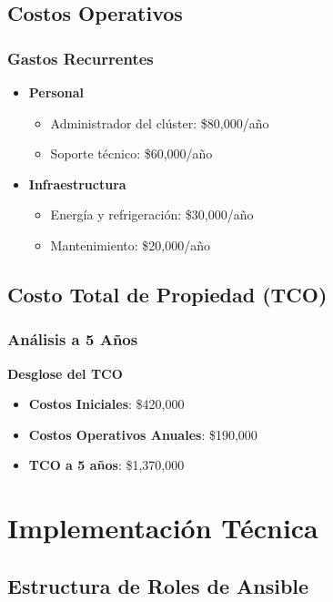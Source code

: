 \section{Costos Operativos}
\subsection{Gastos Recurrentes}
\begin{itemize}
    \item \textbf{Personal}
    \begin{itemize}
        \item Administrador del clúster: \$80,000/año
        \item Soporte técnico: \$60,000/año
    \end{itemize}
    \item \textbf{Infraestructura}
    \begin{itemize}
        \item Energía y refrigeración: \$30,000/año
        \item Mantenimiento: \$20,000/año
    \end{itemize}
\end{itemize}

\section{Costo Total de Propiedad (TCO)}
\subsection{Análisis a 5 Años}
\begin{infocaja}
\textbf{Desglose del TCO}
\begin{itemize}
    \item \textbf{Costos Iniciales}: \$420,000
    \item \textbf{Costos Operativos Anuales}: \$190,000
    \item \textbf{TCO a 5 años}: \$1,370,000
\end{itemize}
\end{infocaja}

\chapter{Implementación Técnica}
\section{Estructura de Roles de Ansible}
